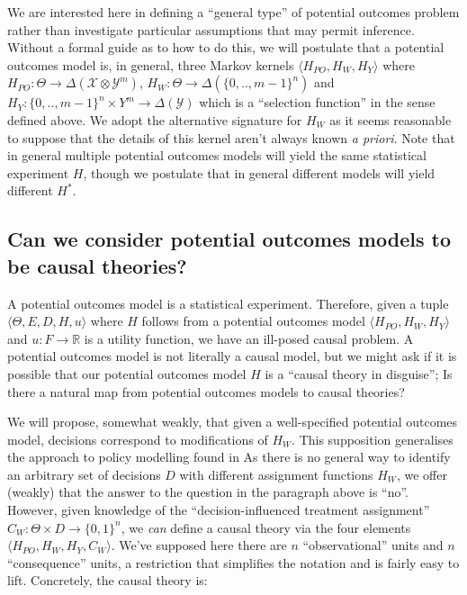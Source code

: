 We are interested here in defining a ``general type'' of potential outcomes problem rather than investigate particular assumptions that may permit inference. Without a formal guide as to how to do this, we will postulate that a potential outcomes model is, in general, three Markov kernels $\langle H_{PO}, H_W, H_Y \rangle$ where $H_{PO}:\Theta\to \Delta(\mathcal{X}\otimes\mathcal{Y}^m)$, $H_W:\Theta\to \Delta(\{0,..,m-1\}^n)$ and $H_Y:\{0,..,m-1\}^n\times Y^m\to \Delta(\mathcal{Y})$ which is a ``selection function'' in the sense defined above. We adopt the alternative signature for $H_W$ as it seems reasonable to suppose that the details of this kernel aren't always known \emph{a priori}. Note that in general multiple potential outcomes models will yield the same statistical experiment $H$, though we postulate that in general different models will yield different $H^*$.

\subsection{Can we consider potential outcomes models to be causal theories?}

A potential outcomes model is a statistical experiment. Therefore, given a tuple $\langle \Theta, E, D, H, u\rangle$ where $H$ follows from a potential outcomes model $\langle H_{PO}, H_W, H_Y \rangle$ and $u:F\to \mathbb{R}$ is a utility function, we have an ill-posed causal problem. A potential outcomes model is not literally a causal model, but we might ask if it is possible that our potential outcomes model $H$ is a ``causal theory in disguise''; Is there a natural map from potential outcomes models to causal theories?

We will propose, somewhat weakly, that given a well-specified potential outcomes model, decisions correspond to modifications of $H_W$. This supposition generalises the approach to policy modelling found in \cite{heckman_policy-relevant_2001.} As there is no general way to identify an arbitrary set of decisions $D$ with different assignment functions $H_W$, we offer (weakly) that the answer to the question in the paragraph above is ``no''. However, given knowledge of the ``decision-influenced treatment assignment'' $C_W:\Theta\times D\to \{0,1\}^n$, we \emph{can} define a causal theory via the four elements $\langle H_{PO}, H_W, H_Y, C_W\rangle$. We've supposed here there are $n$ ``observational'' units and $n$ ``consequence'' units, a restriction that simplifies the notation and is fairly easy to lift. Concretely, the causal theory is:

